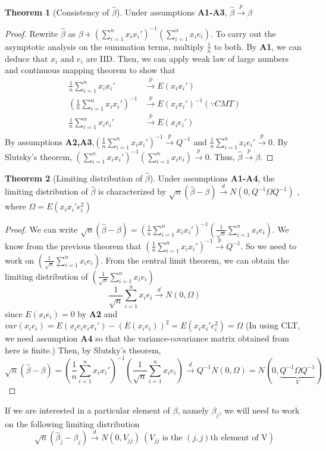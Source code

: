 \documentclass[12pt]{article}
\theoremstyle{definition}
\theoremstyle{property}
\theoremstyle{assumption}
\theoremstyle{example}
\theoremstyle{comment}
\newtheorem{theorem}{Theorem}[section]
\begin{document}
\begin{mdframed}[backgroundcolor=green!5] 
\begin{theorem}[Consistency of $\hat{\beta}$]
Under assumptions \textbf{A1-A3}, $\hat{\beta}\xrightarrow{p}\beta$
\begin{proof}
Rewrite $\hat{\beta}$ as $\beta+\left(\sum_{i=1}^nx_ix_i'\right)^{-1}\left(\sum_{i=1}^nx_ie_i\right)$. To carry out the asymptotic analysis on the summation terms, multiply $\frac{1}{n}$ to both. By \textbf{A1}, we can deduce that $x_i$ and $e_i$ are IID. Then, we can apply weak law of large numbers and continuous mapping theorem to show that
\[
\begin{aligned}
\frac{1}{n}\sum_{i=1}^nx_ix_i'&\xrightarrow{p}E\left(x_ix_i'\right) \\
\left(\frac{1}{n}\sum_{i=1}^nx_ix_i'\right)^{-1}&\xrightarrow{p}E\left(x_ix_i'\right)^{-1} (\because CMT)\\
\frac{1}{n}\sum_{i=1}^nx_ie_i'&\xrightarrow{p}E\left(x_ie_i'\right) \\
\end{aligned}
\]
By assumptions \textbf{A2,A3},$\left(\frac{1}{n}\sum_{i=1}^nx_ix_i'\right)^{-1}\xrightarrow{p}Q^{-1}$ and $\frac{1}{n}\sum_{i=1}^nx_ie_i'\xrightarrow{p}0$. By Slutsky's theorem, $\left(\sum_{i=1}^nx_ix_i'\right)^{-1}\left(\sum_{i=1}^nx_ie_i\right)\xrightarrow{p}0$. Thus, $\hat{\beta}\xrightarrow{p}\beta$.
\end{proof}
\end{theorem}
\begin{theorem}[Limiting distribution of $\hat{\beta}$]
Under assumptions \textbf{A1-A4}, the limiting distribution of $\hat{\beta}$ is characterized by $\sqrt{n}(\hat{\beta}-\beta)\xrightarrow{d}N(0,Q^{-1}\Omega Q^{-1})$ , where $\Omega = E(x_ix_i'e_i^2)$
\begin{proof}
We can write $\sqrt{n}(\hat{\beta}-\beta)=\left(\frac{1}{n}\sum_{i=1}^nx_ix_i'\right)^{-1}\left(\frac{1}{\sqrt{n}}\sum_{i=1}^nx_ie_i\right)$. We know from the previous theorem that $\left(\frac{1}{n}\sum_{i=1}^nx_ix_i'\right)^{-1}\xrightarrow{p}Q^{-1}$. So we need to work on $\left(\frac{1}{\sqrt{n}}\sum_{i=1}^nx_ie_i\right)$. From the central limit theorem, we can obtain the limiting distribution of  $\left(\frac{1}{\sqrt{n}}\sum_{i=1}^nx_ie_i\right)$ 
\[
\frac{1}{\sqrt{n}}\sum_{i=1}^nx_ie_i\xrightarrow{d} N(0,\Omega)
\]
since $E(x_ie_i)=0$ by \textbf{A2} and $var(x_ie_i)= E(x_ie_ie_ix_i')-(E(x_ie_i))^2 = E(x_ix_i'e_i^2)=\Omega$ (In using CLT, we need assumption \textbf{A4} so that the variance-covariance matrix obtained from here is finite.) Then, by Slutsky's theorem, 
\[
\sqrt{n}(\hat{\beta}-\beta)=\left(\frac{1}{n}\sum_{i=1}^nx_ix_i'\right)^{-1}\left(\frac{1}{\sqrt{n}}\sum_{i=1}^nx_ie_i\right)\xrightarrow{d}Q^{-1}N(0,\Omega)=N(0,\underbrace{Q^{-1}\Omega Q^{-1}}_{V})
\]
\end{proof}
\end{theorem}
\end{mdframed} \par
If we are interested in a particular element of $\beta$, namely $\beta_j$, we will need to work on the following limiting distribution
\[
\sqrt{n}(\hat{\beta}_j-\beta_j) \xrightarrow{d} N(0,V_{jj}) \ (V_{jj} \text{ is the $(j,j)$th element of V})
\]
\end{document}
